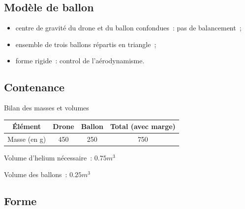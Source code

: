 \subsection{Modèle de ballon}

\begin{frame}
	\begin{itemize}
		\item centre de gravité du drone et du ballon confondues~: pas de balancement~;
		\item ensemble de trois ballons répartis en triangle~;
		\item forme rigide~: control de l'aérodynamisme.
	\end{itemize}
\end{frame}


\subsection{Contenance}

\begin{frame}{Bilan des masses et volumes}
	\begin{center}
		\begin{tabular}{|c|c|c|c|}
			\hline
			Élément & Drone & Ballon & Total (avec marge) \\
			\hline
			Masse (en g) & 450 & 250 & 750 \\
			\hline
		\end{tabular}

	\end{center}

  Volume d'helium nécessaire~: $0.75 m^3$
  
  Volume des ballons~: $0.25 m^3$
\end{frame}

\subsection{Forme}

